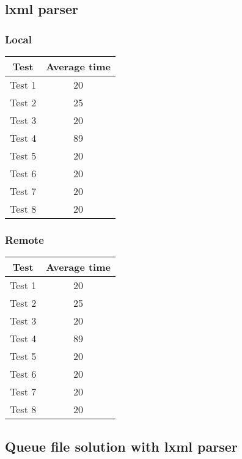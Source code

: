 \subsection{lxml parser}
\subsubsection{Local}
\begin{center}
    \begin{tabular}{| c | c |}
    \hline
    Test & Average time \\ \hline
    Test 1 & 20 \\ \hline
    Test 2 & 25 \\ \hline
    Test 3 & 20 \\ \hline
    Test 4 & 89 \\ \hline
    Test 5 & 20 \\ \hline
    Test 6 & 20 \\ \hline
    Test 7 & 20 \\ \hline
    Test 8 & 20 \\ \hline
    \end{tabular}
\end{center}
\subsubsection{Remote}
\begin{center}
    \begin{tabular}{| c | c |}
    \hline
    Test & Average time \\ \hline
    Test 1 & 20 \\ \hline
    Test 2 & 25 \\ \hline
    Test 3 & 20 \\ \hline
    Test 4 & 89 \\ \hline
    Test 5 & 20 \\ \hline
    Test 6 & 20 \\ \hline
    Test 7 & 20 \\ \hline
    Test 8 & 20 \\ \hline
    \end{tabular}
\end{center}

\subsection{Queue file solution with lxml parser}
